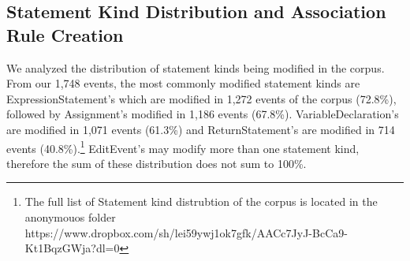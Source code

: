 \documentclass[sigconf]{acmart}
\begin{document}
\subsection{Statement Kind Distribution and Association Rule Creation}

We analyzed the distribution of statement kinds being modified
in the corpus.
From our 1,748 events, the most commonly modified statement
kinds are ExpressionStatement's which are modified in 1,272 
events of
the corpus (72.8\%), followed by Assignment's modified in 1,186
events (67.8\%). VariableDeclaration's are modified in 1,071
events (61.3\%) and ReturnStatement's are modified in 714
events (40.8\%).\footnote{The full list of Statement kind
distrubtion of the corpus is located in the anonymouos folder 
https://www.dropbox.com/sh/lei59ywj1ok7gfk/AACc7JyJ-BcCa9-Kt1BqzGWja?dl=0} 
EditEvent's may modify more than one
statement kind, therefore the sum of these distribution
does not sum to 100\%.




\end{document}
